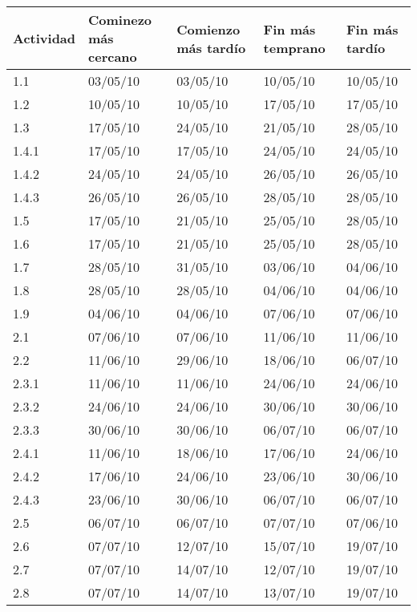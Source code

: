 \documentclass[11pt,a4paper,spanish,twoside]{report}
\begin{document}
\begin{table}[!h]
\centering
   \begin{tabular}{|b{1.8cm}||b{2.2cm}|b{2.2cm}||b{2.2cm}|b{2.2cm}|}
     \hline
     \textbf{Actividad} & \textbf{Cominezo más cercano} &\textbf{Comienzo más
     tardío} & \textbf{Fin más temprano}& \textbf{Fin más tardío}\\
     \hline \hline
     1.1   & 03/05/10 & 03/05/10 & 10/05/10 & 10/05/10 \\
     1.2   & 10/05/10 & 10/05/10 & 17/05/10 & 17/05/10 \\
     1.3   & 17/05/10 & 24/05/10 & 21/05/10 & 28/05/10 \\
     1.4.1 & 17/05/10 & 17/05/10 & 24/05/10 & 24/05/10 \\
     1.4.2 & 24/05/10 & 24/05/10 & 26/05/10 & 26/05/10 \\
     1.4.3 & 26/05/10 & 26/05/10 & 28/05/10 & 28/05/10 \\
     1.5   & 17/05/10 & 21/05/10 & 25/05/10 & 28/05/10 \\
     1.6   & 17/05/10 & 21/05/10 & 25/05/10 & 28/05/10 \\
     1.7   & 28/05/10 & 31/05/10 & 03/06/10 & 04/06/10 \\
     1.8   & 28/05/10 & 28/05/10 & 04/06/10 & 04/06/10 \\
     1.9   & 04/06/10 & 04/06/10 & 07/06/10 & 07/06/10 \\
     \hline
     2.1   & 07/06/10 & 07/06/10 & 11/06/10 & 11/06/10 \\
     2.2   & 11/06/10 & 29/06/10 & 18/06/10 & 06/07/10 \\
     2.3.1 & 11/06/10 & 11/06/10 & 24/06/10 & 24/06/10 \\
     2.3.2 & 24/06/10 & 24/06/10 & 30/06/10 & 30/06/10 \\
     2.3.3 & 30/06/10 & 30/06/10 & 06/07/10 & 06/07/10 \\
     2.4.1 & 11/06/10 & 18/06/10 & 17/06/10 & 24/06/10 \\
     2.4.2 & 17/06/10 & 24/06/10 & 23/06/10 & 30/06/10 \\
     2.4.3 & 23/06/10 & 30/06/10 & 06/07/10 & 06/07/10 \\
     2.5   & 06/07/10 & 06/07/10 & 07/07/10 & 07/06/10 \\
     2.6   & 07/07/10 & 12/07/10 & 15/07/10 & 19/07/10 \\
     2.7   & 07/07/10 & 14/07/10 & 12/07/10 & 19/07/10 \\
     2.8   & 07/07/10 & 14/07/10 & 13/07/10 & 19/07/10 \\

\end{tabular}
\end{table}
\end{document}

